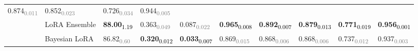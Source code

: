 \begin{table*}[htb]
\begin{tabular}{c|l|*{8}{l}}
0.874\textsubscript{\textcolor{gray}{0.011}} & 0.852\textsubscript{\textcolor{gray}{0.023}} & 
0.726\textsubscript{\textcolor{gray}{0.034}} & 0.944\textsubscript{\textcolor{gray}{0.005}} \\
& LoRA Ensemble &  
\textbf{88.00}\textsubscript{\textcolor{black}{1.19}} & 0.363\textsubscript{\textcolor{gray}{0.049}} & 
0.087\textsubscript{\textcolor{gray}{0.022}} & \textbf{0.965}\textsubscript{\textcolor{black}{0.008}} & 
\textbf{0.892}\textsubscript{\textcolor{black}{0.007}} & \textbf{0.879}\textsubscript{\textcolor{black}{0.013}} & 
\textbf{0.771}\textsubscript{\textcolor{black}{0.019}} & \textbf{0.956}\textsubscript{\textcolor{black}{0.001}} \\ 
& Bayesian LoRA & 
86.82\textsubscript{\textcolor{gray}{0.60}} & \textbf{0.320}\textsubscript{\textcolor{black}{0.012}} & 
\textbf{0.033}\textsubscript{\textcolor{black}{0.007}} & 0.869\textsubscript{\textcolor{gray}{0.015}} & 
0.868\textsubscript{\textcolor{gray}{0.006}} & 0.868\textsubscript{\textcolor{gray}{0.006}} & 
0.737\textsubscript{\textcolor{gray}{0.012}} & 0.937\textsubscript{\textcolor{gray}{0.003}} \\ 
\bottomrule
\end{tabular}
\end{table*}



